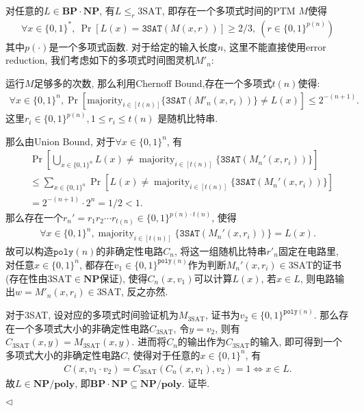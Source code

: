 \documentclass[11pt]{article}
\newcommand{\NP}{\mathbf{NP}}
\newcommand{\1}{\mathbf{1}}
\DeclareMathOperator{\majority}{majority}
\newenvironment{answer}[1][Solution]{\begin{trivlist}
\item[\hskip \labelsep{\bfseries#1.}\hskip \labelsep]}{\hfill$\lhd$\end{trivlist}}
\begin{document}
\begin{answer}
    对任意的$L \in \mathbf{BP\cdot}\NP$, 有$L \le_r \text{3SAT}$, 即存在一个多项式时间的PTM $M$使得
    \begin{align}
        \label{eq:2}
        \forall x \in \{0,1\}^*,~ \Pr[L(x) = \texttt{3SAT}(M(x,r))] \ge 2/3, ~\left(r \in \{0,1\}^{p(n)}\right)
    \end{align}
    其中$p(\cdot)$是一个多项式函数. 对于给定的输入长度$n$, 这里不能直接使用error reduction, 
    我们考虑如下的多项式时间图灵机$M'_n$:
    
    运行$M$足够多的次数, 那么利用Chernoff Bound,存在一个多项式$t(n)$使得:
    \begin{align}
        \label{eq:3}
        \forall x \in \{0,1\}^n, \Pr\left[\text{majority}_{i \in [t(n)]} \{\texttt{3SAT}(M'_n(x, r_i))\} \neq L(x)\right] \le 2^{-(n+1)}.
    \end{align}
    这里$r_i \in \{0,1\}^{p(n)}, 1\le r_i\le t(n)$ 是随机比特串.

    那么由Union Bound, 对于$\forall x \in \{0,1\}^n$, 有
    \begin{align*}
        &\Pr\left[\bigcup_{x \in \{0,1\}^n} L(x) \neq \majority_{i\in[t(n)]}\{\texttt{3SAT}(M_n'(x, r_i))\}\right] \\
        &\le \sum_{x \in \{0,1\}^n}\Pr\left[L(x) \neq  \majority_{i\in[t(n)]}\{\texttt{3SAT}(M_n'(x, r_i))\}\right] \\
        &= 2^{-(n+1)} \cdot 2^n = 1/2 < 1.
    \end{align*}
    那么存在一个$r_n' = r_1r_2\cdots r_{t(n)} \in \{0,1\}^{p(n)\cdot t(n)}$, 使得
    \begin{align*}
        \forall x \in \{0,1\}^n, \majority_{i\in[t(n)]}\{\texttt{3SAT}(M_n'(x, r_i))\} = L(x).
    \end{align*}
    故可以构造$\texttt{poly}(n)$的非确定性电路$C_n$, 将这一组随机比特串$r'_n$固定在电路里, 对任意$x\in\{0,1\}^n$, 都存在$v_1 \in \{0,1\}^{\texttt{poly}(n)}$作为判断$M_n'(x,r_i) \in \text{3SAT}$的证书(存在性由$\text{3SAT} \in \NP$保证), 使得$C_n(x, v_1)$可以计算$L(x)$, 若$x \in L$, 则电路输出$w = M'_n(x,r_i) \in \text{3SAT}$, 反之亦然. 

    对于3SAT, 设对应的多项式时间验证机为$M_{\text{3SAT}}$, 证书为$v_2 \in \{0,1\}^{\texttt{poly}(n)}$. 那么存在一个多项式大小的非确定性电路$C_{\text{3SAT}}$, 令$y = v_2$, 则有$C_{\text{3SAT}}(x,y) = M_{\text{3SAT}}(x,y)$. 进而将$C_n$的输出作为$C_{\text{3SAT}}$的输入, 即可得到一个多项式大小的非确定性电路$C$, 使得对于任意的$x \in \{0,1\}^n$, 有
    \begin{align*}
        C(x, v_1\cdot v_2) = C_{\text{3SAT}}(C_n(x, v_1), v_2) = 1 \iff x \in L.
    \end{align*}
    故$L \in \NP\textbf{/poly}$, 即$\mathbf{BP\cdot}\NP \subseteq \NP\textbf{/poly}$. 证毕.


\end{answer}
\end{document}

